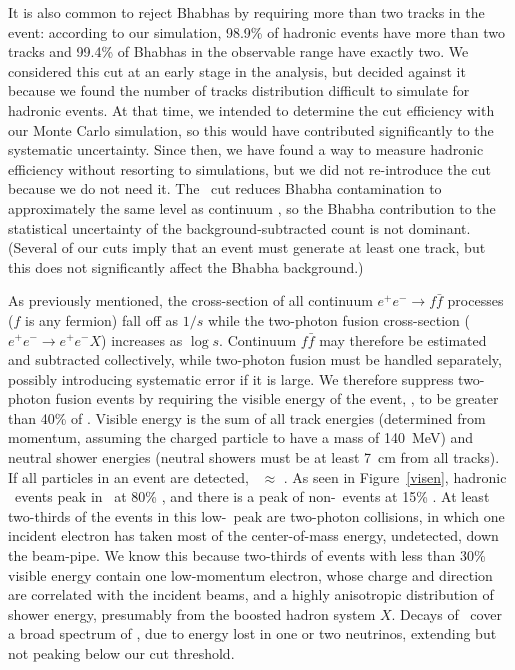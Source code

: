 \documentclass{cornell}
\begin{document}
It is also common to reject Bhabhas by requiring more than two tracks
in the event: according to our simulation, 98.9\% of hadronic events
have more than two tracks and 99.4\% of Bhabhas in the observable
range have exactly two.  We considered this cut at an early stage in
the analysis, but decided against it because we found the number of
tracks distribution difficult to simulate for hadronic events.  At
that time, we intended to determine the cut efficiency with our Monte
Carlo simulation, so this would have contributed significantly to the
systematic uncertainty.  Since then, we have found a way to measure
hadronic efficiency without resorting to simulations, but we did not
re-introduce the cut because we do not need it.  The \pmax\ cut
reduces Bhabha contamination to approximately the same level as
continuum \qqbar, so the Bhabha contribution to the statistical
uncertainty of the background-subtracted count is not dominant.
(Several of our cuts imply that an event must generate at least one
track, but this does not significantly affect the Bhabha background.)

As previously mentioned, the cross-section of all continuum $e^+e^-
\to f\bar{f}$ processes ($f$ is any fermion) fall off as $1/s$ while
the two-photon fusion cross-section ($e^+e^- \to e^+e^- X$) increases
as $\log s$.  Continuum $f\bar{f}$ may therefore be estimated and
subtracted collectively, while two-photon fusion must be handled
separately, possibly introducing systematic error if it is large.  We
therefore suppress two-photon fusion events by requiring the visible
energy of the event, \visen, to be greater than 40\% of \ecm.  Visible
energy is the sum of all track energies (determined from momentum,
assuming the charged particle to have a mass of 140~MeV) and neutral
shower energies (neutral showers must be at least 7~cm from all
tracks).  If all particles in an event are detected, \visen\ $\approx$
\ecm.  As seen in Figure~\ref{visen}, hadronic \ups\ events peak in
\visen\ at 80\% \ecm, and there is a peak of non-\ups\ events at 15\%
\ecm.  At least two-thirds of the events in this low-\visen\ peak are
two-photon collisions, in which one incident electron has taken most
of the center-of-mass energy, undetected, down the beam-pipe.  We know
this because two-thirds of events with less than 30\% visible energy
contain one low-momentum electron, whose charge and direction are
correlated with the incident beams, and a highly anisotropic
distribution of shower energy, presumably from the boosted hadron
system $X$.  Decays of \tautau\ cover a broad spectrum of \visen, due
to energy lost in one or two neutrinos, extending but not peaking
below our cut threshold.
\end{document}
